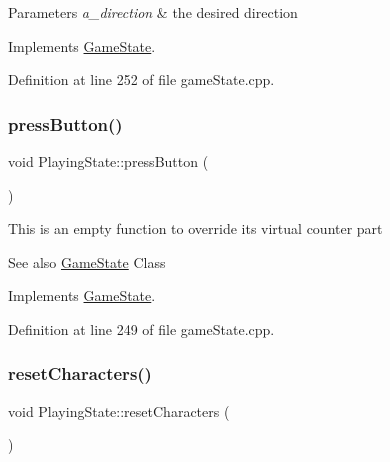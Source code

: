 \begin{DoxyParams}{Parameters}
{\em a\+\_\+direction} & the desired direction \\
\hline
\end{DoxyParams}


Implements \hyperlink{class_game_state_aaae8c1b3ae6969eb2dd81bfc12fbf43f}{Game\+State}.



Definition at line 252 of file game\+State.\+cpp.

\mbox{\label{class_playing_state_ae59ff244a6cd4a3c6f6fcaef41f4d8c5}} 
\subsubsection{\texorpdfstring{press\+Button()}{pressButton()}}
{\footnotesize\ttfamily void Playing\+State\+::press\+Button (\begin{DoxyParamCaption}{ }\end{DoxyParamCaption})\hspace{0.3cm}{\ttfamily [virtual]}}

This is an empty function to override it\textquotesingle{}s virtual counter part \begin{DoxySeeAlso}{See also}
\hyperlink{class_game_state}{Game\+State} Class 
\end{DoxySeeAlso}


Implements \hyperlink{class_game_state_aa14eeaf244bcf19b7013af75cb722dde}{Game\+State}.



Definition at line 249 of file game\+State.\+cpp.

\mbox{\label{class_playing_state_ac1d69f92915e66c4335c6218c0837179}} 
\subsubsection{\texorpdfstring{reset\+Characters()}{resetCharacters()}}
{\footnotesize\ttfamily void Playing\+State\+::reset\+Characters (\begin{DoxyParamCaption}{ }\end{DoxyParamCaption})}


